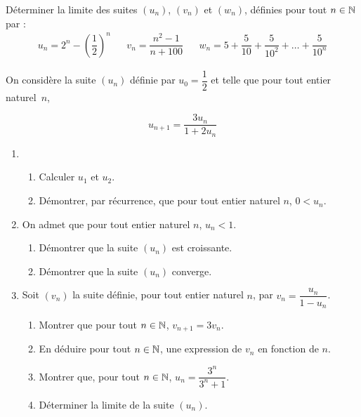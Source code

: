 \documentclass[a4paper,10pt,DIV15,BCOR0mm]{scrartcl}
\begin{document}
\begin{exercice}
Déterminer la limite des suites $(u_n)$, $(v_n)$ et $(w_n)$, définies
pour tout $n\in\mathbb{N}$ par :
\begin{align*}
u_n=2^n-\left(\dfrac12\right)^n&&v_n=\dfrac{n^2-1}{n+100}&&w_n=5+\dfrac{5}{10}+\dfrac{5}{10^2}+\dots+\dfrac{5}{10^n}
\end{align*}
\end{exercice}



\begin{exercice}
On considère la suite $(u_n)$ définie par $u_0=\dfrac{1}{2}$ et telle que pour tout entier naturel~$n$, 

\[u_{n+1} = \dfrac{3u_n}{1+2u_n}\]

\begin{enumerate}
\item
  	\begin{enumerate}
  		\item Calculer $u_1$ et $u_2$.
  		\item Démontrer, par récurrence, que pour tout entier naturel $n$, $0 < u_n$.
  	\end{enumerate}
\item On admet que pour tout entier naturel $n$, $u_n<1$.
  	\begin{enumerate}
  		\item Démontrer que la suite $\left(u_n\right)$ est croissante.
  		\item Démontrer que la suite $\left(u_n\right)$ converge.
  	\end{enumerate}
\item Soit $\left(v_n\right)$ la suite définie, pour tout entier naturel $n$, par $v_n = \dfrac{u_n}{1 - u_n}$.
  	\begin{enumerate}
  		\item Montrer que pour tout $n\in\mathbb{N}$, $v_{n+1}=3v_n$.
  		\item En déduire pour tout $n\in\mathbb{N}$, une expression de $v_n$ en fonction de $n$.
  		\item Montrer que, pour tout $n\in\mathbb{N}$, $u_n = \dfrac{3^n}{3^n+1}$.
  		\item Déterminer la limite de la suite $(u_n)$.
  	\end{enumerate}
\end{enumerate}
\end{exercice}
\end{document}
